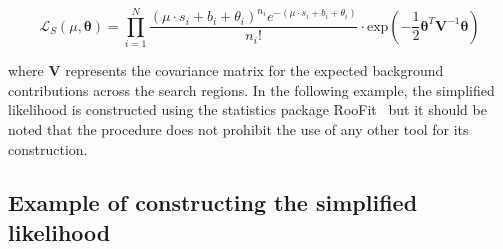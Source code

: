 \begin{equation}
\mathcal{L}_{S}(\mu, \boldsymbol{\theta}) =  \prod_{i=1}^{N} \dfrac{(\mu \cdot s_{i}+b_{i}+\theta_{i})^{n_{i}} e^{-(\mu \cdot s_{i}+b_{i}+\theta_{i})} }{n_{i}!} \cdot  
\mathrm{exp}\left(-\dfrac{1}{2} \boldsymbol{\theta}^{T}\mathrm{\mathbf{V}}^{-1}\boldsymbol{\theta} \right)
\label{eq:full-likelihood}
\end{equation}

where $\mathrm{\mathbf{V}}$ represents the covariance matrix for the expected background contributions across the search regions.
In the following example, the simplified likelihood is constructed using the statistics package {\sc RooFit}~\cite{roofit} but it should be noted that 
the procedure does not prohibit the use of any other tool for its construction. 

\subsection{Example of constructing the simplified likelihood}
\label{sec:sl-toy}

